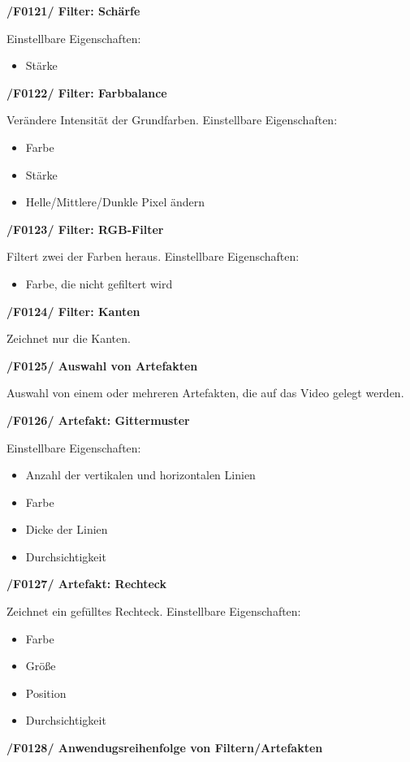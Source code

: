 \documentclass[parskip=full]{scrartcl}
\begin{document}
\textbf{/F0121/ Filter: Schärfe}

Einstellbare Eigenschaften:
\begin{itemize}
\item Stärke
\end{itemize}

\textbf{/F0122/ Filter: Farbbalance}

Verändere Intensität der Grundfarben.
Einstellbare Eigenschaften:
\begin{itemize}
\item Farbe
\item Stärke
\item Helle/Mittlere/Dunkle Pixel ändern
\end{itemize}

\textbf{/F0123/ Filter: RGB-Filter}

Filtert zwei der Farben heraus.
Einstellbare Eigenschaften:
\begin{itemize}
\item Farbe, die nicht gefiltert wird
\end{itemize}

\textbf{/F0124/ Filter: Kanten}

Zeichnet nur die Kanten.

\textbf{/F0125/ Auswahl von Artefakten}

Auswahl von einem oder mehreren Artefakten, die auf das Video gelegt werden.

\textbf{/F0126/ Artefakt: Gittermuster}

Einstellbare Eigenschaften:
\begin{itemize}
\item Anzahl der vertikalen und horizontalen Linien
\item Farbe
\item Dicke der Linien
\item Durchsichtigkeit
\end{itemize}

\textbf{/F0127/ Artefakt: Rechteck}

Zeichnet ein gefülltes Rechteck.
Einstellbare Eigenschaften:
\begin{itemize}
\item Farbe
\item Größe
\item Position
\item Durchsichtigkeit
\end{itemize}




\textbf{/F0128/ Anwendugsreihenfolge von Filtern/Artefakten}
\end{document}
